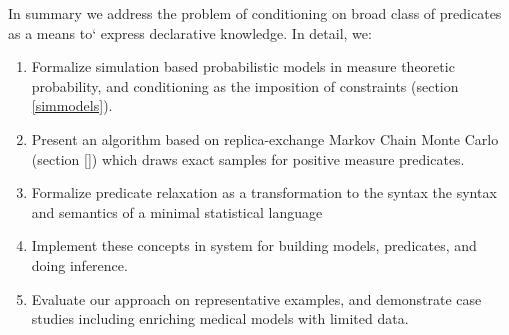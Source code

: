 

In summary we address the problem of conditioning on broad class of predicates as a means to` express declarative knowledge.
In detail, we:

\begin{enumerate}
	\item Formalize simulation based probabilistic models in measure theoretic probability, and conditioning as the imposition of constraints (section \ref{simmodels}).
	\item Present an algorithm based on replica-exchange Markov Chain Monte Carlo (section \ref{}) which draws exact samples for positive measure predicates. 
	\item Formalize predicate relaxation as a transformation to the syntax   the syntax and semantics of a minimal statistical language 
	\item Implement these concepts in system for building models, predicates, and doing inference.
	\item Evaluate our approach on representative examples, and demonstrate case studies including enriching medical models with limited data.
\end{enumerate}



